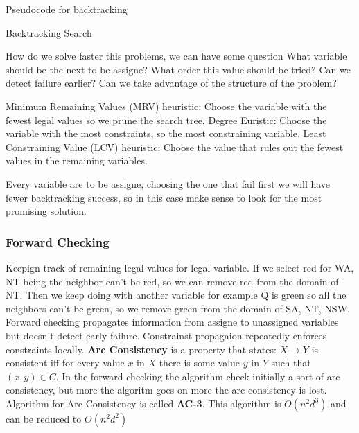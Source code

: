 \documentclass[12pt]{book}
\begin{document}
Pseudocode for backtracking
\begin{algorithm}
\caption{Backtracking Search}
\begin{algorithmic}[1]
\end{algorithmic}
\end{algorithm}

How do we solve faster this problems, we can have some question
What variable should be the next to be assigne? \newline
What order this value should be tried? \newline
Can we detect failure earlier? \newline
Can we take advantage of the structure of the problem? \newline

Minimum Remaining Values (MRV) heuristic: Choose the variable with the fewest legal values so we prune the search tree.
\newline
Degree Euristic: Choose the variable with the most constraints, so the most constraining variable.
\newline
Least Constraining Value (LCV) heuristic: Choose the value that rules out the fewest values in the remaining variables.

Every variable are to be assigne, choosing the one that fail first we will have fewer backtracking success, so in this case make sense to look for the most promising solution.


\subsubsection{Forward Checking}
Keepign track of remaining legal values for legal variable.
If we select red for WA, NT being the neighbor can't be red, so we can remove red from the domain of NT.
Then we keep doing with another variable for example Q is green so all the neighbors can't be green, so we remove green from the domain of SA, NT, NSW.
\newline
Forward checking propagates information from assigne to unassigned variables but doesn't detect early failure. Constrainst propagaion repeatedly enforces constraints locally.
\textbf{Arc Consistency} is a property that states: $X \rightarrow Y$ is consistent iff for every value $x$ in $X$ there is some value $y$ in $Y$ such that $(x, y) \in C$.
In the forward checking the algorithm check initially a sort of arc consistency, but more the algoritm goes on more the arc consistency is lost.
Algorithm for Arc Consistency is called \textbf{AC-3}. This algorithm is $O(n^2d^3)$ and can be reduced to $O(n^2d^2)$
\end{document}
